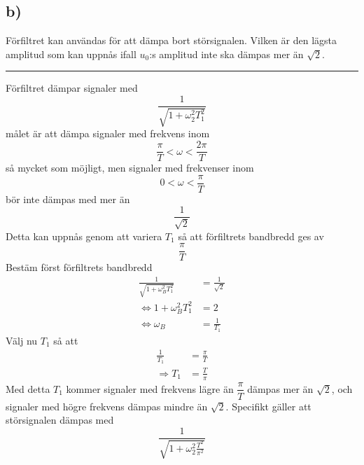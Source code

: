 \documentclass[12pt]{article}
\newcommand{\qline}{\hrule \vspace*{10pt}}
\begin{document}
\subsection*{b)}
Förfiltret kan användas för att dämpa bort störsignalen. Vilken är den lägsta amplitud som kan uppnås ifall $u_0$:s amplitud inte ska dämpas mer än $\sqrt{2}$.
\qline
Förfiltret dämpar signaler med
\[\frac{1}{\sqrt{1+\omega_2^2 T_1^2}}\]
målet är att dämpa signaler med frekvens inom
\[\frac{\pi}{T} < \omega < \frac{2\pi}{T}\]
så mycket som möjligt, men signaler med frekvenser inom 
\[0 < \omega < \frac{\pi}{T}\]
bör inte dämpas med mer än 
\[\frac{1}{\sqrt{2}}\]
Detta kan uppnås genom att variera $T_1$ så att förfiltrets bandbredd ges av 
\[\frac{\pi}{T}\]
Bestäm först förfiltrets bandbredd 
\begin{align*}
  \frac{1}{\sqrt{1+\omega_B^2 T_1^2}} &= \frac{1}{\sqrt{2}}  \\
  \Leftrightarrow 1+\omega_B^2 T_1^2 &= 2 \\
  \Leftrightarrow \omega_B &= \frac{1}{T_1}
\end{align*}
Välj nu $T_1$ så att
\begin{align*}
  \frac{1}{T_1} &= \frac{\pi}{T} \\
  \Rightarrow T_1 &= \frac{T}{\pi}
\end{align*}
Med detta $T_1$ kommer signaler med frekvens lägre än $\dfrac{\pi}{T}$ dämpas mer än $\sqrt{2}$, och signaler med högre frekvens dämpas mindre än $\sqrt{2}$. Specifikt gäller att störsignalen dämpas med 
\[\frac{1}{\sqrt{1+\omega_2^2 \frac{T^2}{\pi^2}}}\]
\end{document}
